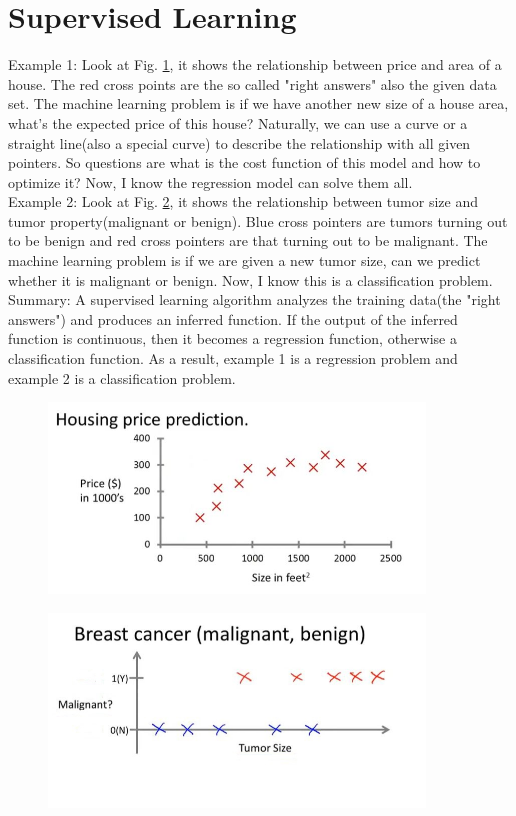 \documentclass{article}
\begin{document}
\section{Supervised Learning}
Example 1: Look at Fig. \ref{example1_of_supervised_learning}, it shows the relationship between price and area of a house. The red cross points are the so called "right answers" also the given data set. The machine learning problem is if we have another new size of a house area, what's the expected price of this house? Naturally, we can use a curve or a straight line(also a special curve) to describe the relationship with all given pointers. So questions are what is the cost function of this model and how to optimize it? Now, I know the regression model can solve them all.\\
Example 2: Look at Fig. \ref{example2_of_supervised_learning}, it shows the relationship between tumor size and tumor property(malignant or benign). Blue cross pointers are tumors turning out to be benign and red cross pointers are that turning out to be malignant. The machine learning problem is if we are given a new tumor size, can we predict whether it is malignant or benign. Now, I know this is a classification problem.\\
Summary: A supervised learning algorithm analyzes the training data(the "right answers") and produces an inferred function. If the output of the inferred function is continuous, then it becomes a regression function, otherwise a classification function. As a result, example 1 is a regression problem and example 2 is a classification problem.
\begin{figure}[ht]
  \centering
  \includegraphics[width=10cm]{Figure1.jpg}\\
  \caption{}\label{example1_of_supervised_learning}
\end{figure}
\begin{figure}[ht]
  \centering
  \includegraphics[width=10cm]{Figure2.jpg}\\
  \caption{}\label{example2_of_supervised_learning}
\end{figure}
\end{document}
